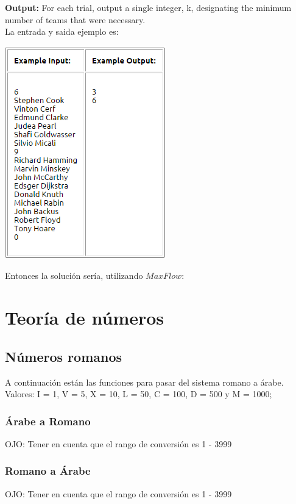 \documentclass[10pt,letterpaper,twocolumn]{article}
\newcommand{\source}[1]{
  
  \dotfill
}
\begin{document}
\textbf{Output:}  For each trial, output a single integer, k, designating the minimum number of teams that were necessary.\\
\newline
La entrada y saida ejemplo es:\\
  \begin{center}
  \includegraphics{./src/konigSample.png}
  \end{center}
Entonces la solución sería, utilizando $MaxFlow$:\\
  \source{src/konigSampleCode.cpp}
\section{Teoría de números}
  \subsection{Números romanos}
    A continuación están las funciones para pasar del sistema romano a árabe.\\
    Valores: I = 1, V = 5, X = 10, L = 50, C = 100, D = 500 y M = 1000;
    \subsubsection{Árabe a Romano}
      OJO: Tener en cuenta que el rango de conversión es 1 - 3999
      \source{src/arabicToRoman.cpp}
    \subsubsection{Romano a Árabe}
      OJO: Tener en cuenta que el rango de conversión es 1 - 3999
      \source{src/romanToArabic.cpp}
\end{document}
